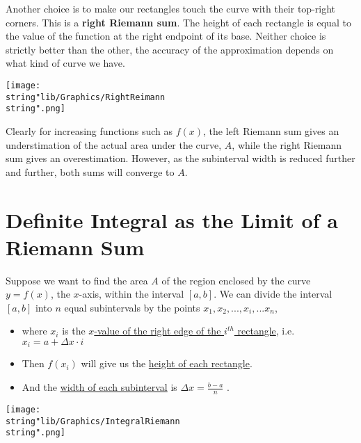 \documentclass[11pt,a4paper]{book}
\begin{document}
Another choice is to make our rectangles touch the curve with their
top-right corners. This is a \textbf{right Riemann sum}. The height
of each rectangle is equal to the value of the function at the right
endpoint of its base. Neither choice is strictly better than the other,
the accuracy of the approximation depends on what kind of curve we
have.
\begin{center}
\texttt{[image: \\string"lib/Graphics/RightReimann\\string".png]}
\par\end{center}

Clearly for increasing functions such as $f\left(x\right)$, the left
Riemann sum gives an understimation of the actual area under the curve,
$A$, while the right Riemann sum gives an overestimation. However,
as the subinterval width is reduced further and further, both sums
will converge to $A$.

\newpage{}

\section{Definite Integral as the Limit of a Riemann Sum}

Suppose we want to find the area $A$ of the region enclosed by the
curve $y=f(x)$, the $x$-axis, within the interval $[a,b]$. We can
divide the interval $[a,b]$ into $n$ equal subintervals by the points
$x_{1},x_{2},...,x_{i},...x_{n}$,

\begin{minipage}[t]{.5\textwidth}

\medskip
\begin{itemize}
\item where $x_{i}$ is the \uline{\mbox{$x$}-value of the right edge
of the \mbox{$i^{th}$} rectangle}, i.e. $x_{i}=a+\Delta x\cdot i$
\item Then $f(x_{i})$ will give us the \uline{height of each rectangle}.
\item And the \uline{width of each subinterval} is $\Delta x={\displaystyle \frac{b-a}{n}}$
.
\end{itemize}
\end{minipage}
\begin{minipage}[t]{.5\textwidth}
\begin{center}
\texttt{[image: \\string"lib/Graphics/IntegralRiemann\\string".png]}
\par\end{center}

\end{minipage}
\end{document}
